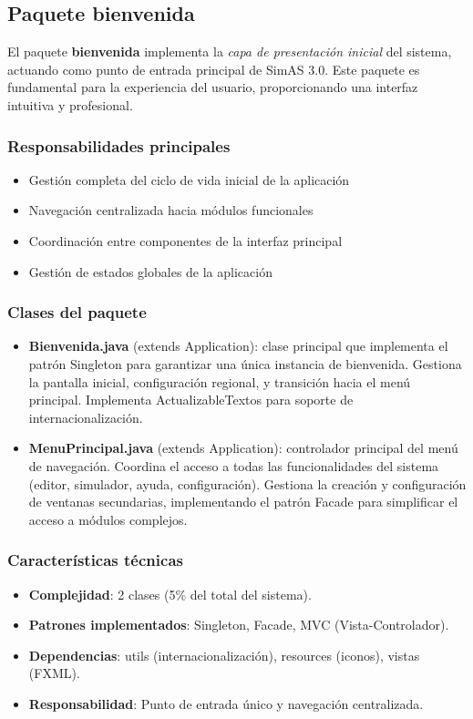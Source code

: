 \subsection{Paquete bienvenida}

El paquete \textbf{bienvenida} implementa la \textit{capa de presentación inicial} del sistema, actuando como punto de entrada principal de SimAS 3.0. Este paquete es fundamental para la experiencia del usuario, proporcionando una interfaz intuitiva y profesional.

\subsubsection{Responsabilidades principales}
\begin{itemize}
    \item Gestión completa del ciclo de vida inicial de la aplicación
    \item Navegación centralizada hacia módulos funcionales
    \item Coordinación entre componentes de la interfaz principal
    \item Gestión de estados globales de la aplicación
\end{itemize}

\subsubsection{Clases del paquete}

\begin{itemize}
    \item \textbf{Bienvenida.java} (extends Application): clase principal que implementa el patrón Singleton para garantizar una única instancia de bienvenida. Gestiona la pantalla inicial, configuración regional, y transición hacia el menú principal. Implementa ActualizableTextos para soporte de internacionalización.

    \item \textbf{MenuPrincipal.java} (extends Application): controlador principal del menú de navegación. Coordina el acceso a todas las funcionalidades del sistema (editor, simulador, ayuda, configuración). Gestiona la creación y configuración de ventanas secundarias, implementando el patrón Facade para simplificar el acceso a módulos complejos.
\end{itemize}

\subsubsection{Características técnicas}
\begin{itemize}
    \item \textbf{Complejidad}: 2 clases (5\% del total del sistema).
    \item \textbf{Patrones implementados}: Singleton, Facade, MVC (Vista-Controlador).
    \item \textbf{Dependencias}: utils (internacionalización), resources (iconos), vistas (FXML).
    \item \textbf{Responsabilidad}: Punto de entrada único y navegación centralizada.
\end{itemize}

